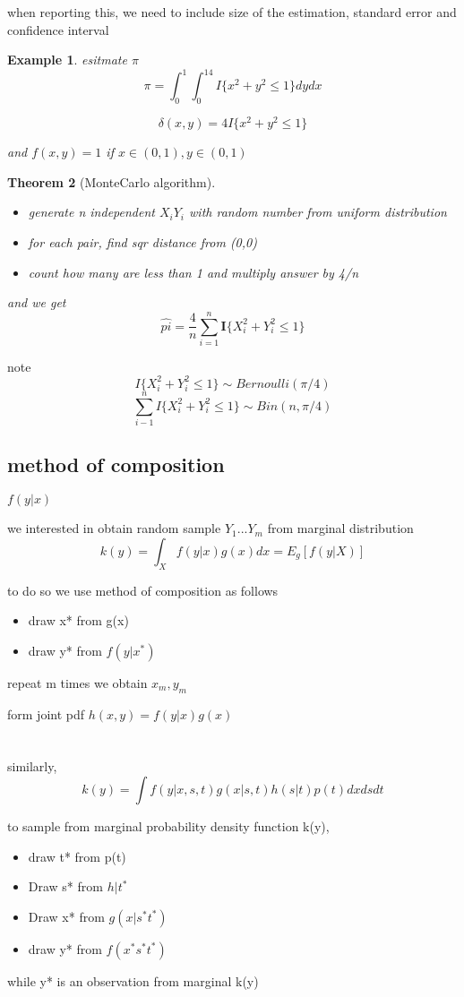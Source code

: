 \documentclass[10pt]{article}
\theoremstyle{break}
\newtheorem{thm}{Theorem}[subsection]
\newtheorem{ex}[thm]{Example}
\begin{document}
when reporting this, we need to include size of the estimation, standard error and confidence interval 

\begin{ex}
esitmate $\pi$
$$\pi=\int_0^1\int_0^14I\{x^2+y^2\leq 1\}dydx$$

$$\delta(x,y)=4I\{x^2+y^2\leq 1\}$$

and $f(x,y)=1$ if $x\in(0,1), y\in(0,1)$
\end{ex}

\begin{thm}[MonteCarlo algorithm]
    \begin{itemize}
        \item generate n independent $X_i Y_i$ with random number from uniform distribution 
        \item for each pair, find sqr distance from (0,0)
        \item count how many are less than 1 and multiply answer by 4/n
    \end{itemize}

    and we get $$\hat{pi}=\frac{4}{n}\sum_{i=1}^{n}\mathbf{I}\{X_i^2+Y_i^2\leq 1\}$$


\end{thm}
    note$$I\{X_i^2+Y_i^2\leq1\}\sim Bernoulli(\pi/4)$$
    $$\sum^n_{i-1}I\{X_i^2+Y_i^2\leq1\}\sim Bin(n,\pi/4)$$

\subsection{method of composition}
$f(y|x)$

we interested in obtain random sample $Y_1...Y_m$ from marginal distribution
$$k(y)=\int_Xf(y|x)g(x)dx=E_g[f(y|X)]$$

to do so we use method of composition as follows 
\begin{itemize}
    \item draw x* from g(x)
    \item draw y* from $f(y|x^*)$
\end{itemize}

repeat m times we obtain $x_m, y_m$

form joint pdf $h(x,y)=f(y|x)g(x)$
\\\\\\
similarly, $$k(y)=\int f(y|x,s,t)g(x|s,t)h(s|t)p(t)dxdsdt$$

to sample from marginal probability density function k(y),
\begin{itemize}
    \item draw t* from p(t)
    \item Draw s* from $h|t^*$
    \item Draw x* from $g(x|s^* t^*)$
    \item draw y* from $f(x^* s^* t^*)$
\end{itemize}
 while y* is an observation from marginal k(y)
\end{document}
